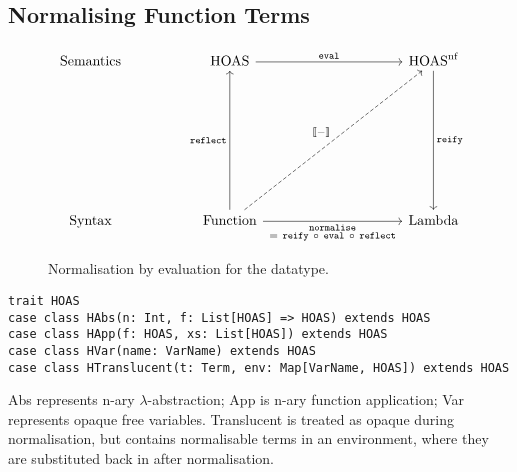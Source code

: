 \documentclass[../../main.tex]{subfiles}
\begin{document}
\subsection{Normalising Function Terms}
\begin{figure}[htbp]
\begin{equation*}
\begin{tikzcd}[sep=5em]
  \text{Semantics} & \text{HOAS} \arrow[rr, "\texttt{eval}"]                                                                                                                                         &  & \text{HOAS}^\text{nf} \arrow[dd, "\texttt{reify}"] \\
                   &                                                                                                                                                                                 &  &                                                    \\
  \text{Syntax}    & \text{Function} \arrow[uu, "\texttt{reflect}"] \arrow[rr, "\substack{\texttt{normalise} \\ =\ \texttt{reify}\ \circ\ \texttt{eval}\ \circ\ \texttt{reflect}}"'] \arrow[rruu, "{\text{\textlbrackdbl} - \text{\textrbrackdbl}}", dashed] &  & \text{Lambda}                                     
\end{tikzcd}
\end{equation*}
\caption{Normalisation by evaluation for the  datatype.}
\end{figure}

\begin{verbatim}
trait HOAS
case class HAbs(n: Int, f: List[HOAS] => HOAS) extends HOAS
case class HApp(f: HOAS, xs: List[HOAS]) extends HOAS
case class HVar(name: VarName) extends HOAS
case class HTranslucent(t: Term, env: Map[VarName, HOAS]) extends HOAS
\end{verbatim}
%
Abs represents n-ary $\lambda$-abstraction; App is n-ary function application; Var represents opaque free variables.
Translucent is treated as opaque during normalisation, but contains normalisable terms in an environment, where they are substituted back in after normalisation.
\end{document}

